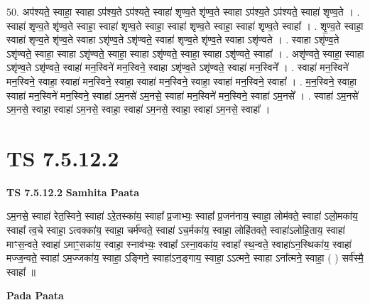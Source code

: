 \documentclass[17pt]{extarticle}
\begin{document}
50. अप॑श्यते॒ स्वाहा॒ स्वाहा ऽप॑श्य॒ते ऽप॑श्यते॒ स्वाहा॑ शृण्व॒ते शृ॑ण्व॒ते स्वाहा ऽप॑श्य॒ते ऽप॑श्यते॒ स्वाहा॑ शृण्व॒ते । . स्वाहा॑ शृण्व॒ते शृ॑ण्व॒ते स्वाहा॒ स्वाहा॑ शृण्व॒ते स्वाहा॒ स्वाहा॑ शृण्व॒ते स्वाहा॒ स्वाहा॑ शृण्व॒ते स्वाहा᳚ । . शृ॒ण्व॒ते स्वाहा॒ स्वाहा॑ शृण्व॒ते शृ॑ण्व॒ते स्वाहा ऽशृ॑ण्व॒ते ऽशृ॑ण्वते॒ स्वाहा॑ शृण्व॒ते शृ॑ण्व॒ते स्वाहा ऽशृ॑ण्वते । . स्वाहा ऽशृ॑ण्व॒ते ऽशृ॑ण्वते॒ स्वाहा॒ स्वाहा ऽशृ॑ण्वते॒ स्वाहा॒ स्वाहा ऽशृ॑ण्वते॒ स्वाहा॒ स्वाहा ऽशृ॑ण्वते॒ स्वाहा᳚ । . अशृ॑ण्वते॒ स्वाहा॒ स्वाहा ऽशृ॑ण्व॒ते ऽशृ॑ण्वते॒ स्वाहा॑ मन॒स्विने॑ मन॒स्विने॒ स्वाहा ऽशृ॑ण्व॒ते ऽशृ॑ण्वते॒ स्वाहा॑ मन॒स्विने᳚ । . स्वाहा॑ मन॒स्विने॑ मन॒स्विने॒ स्वाहा॒ स्वाहा॑ मन॒स्विने॒ स्वाहा॒ स्वाहा॑ मन॒स्विने॒ स्वाहा॒ स्वाहा॑ मन॒स्विने॒ स्वाहा᳚ । . म॒न॒स्विने॒ स्वाहा॒ स्वाहा॑ मन॒स्विने॑ मन॒स्विने॒ स्वाहा॑ ऽम॒नसे॑ ऽम॒नसे॒ स्वाहा॑ मन॒स्विने॑ मन॒स्विने॒ स्वाहा॑ ऽम॒नसे᳚ । . स्वाहा॑ ऽम॒नसे॑ ऽम॒नसे॒ स्वाहा॒ स्वाहा॑ ऽम॒नसे॒ स्वाहा॒ स्वाहा॑ ऽम॒नसे॒ स्वाहा॒ स्वाहा॑ ऽम॒नसे॒ स्वाहा᳚ । \newline
\pagebreak
{}

\section{ TS 7.5.12.2 }

\textbf{TS 7.5.12.2 } \newline
\textbf{Samhita Paata} \newline

ऽम॒नसे॒ स्वाहा॑ रेत॒स्विने॒ स्वाहा॑ ऽरे॒तस्का॑य॒ स्वाहा᳚ प्र॒जाभ्यः॒ स्वाहा᳚ प्र॒जन॑नाय॒ स्वाहा॒ लोम॑वते॒ स्वाहा॑ ऽलो॒मका॑य॒ स्वाहा᳚ त्व॒चे स्वाहा॒ ऽत्वक्का॑य॒ स्वाहा॒ चर्म॑ण्वते॒ स्वाहा॑ ऽच॒र्मका॑य॒ स्वाहा॒ लोहि॑तवते॒ स्वाहा॑ऽलोहि॒ताय॒ स्वाहा॑ माꣳस॒न्वते॒ स्वाहा॑ ऽमाꣳ॒॒सका॑य॒ स्वाहा॒ स्नाव॑भ्यः॒ स्वाहा᳚ ऽस्ना॒वका॑य॒ स्वाहा᳚ स्थ॒न्वते॒ स्वाहा॑ऽन॒स्थिका॑य॒ स्वाहा॑ मज्ज॒न्वते॒ स्वाहा॑ ऽम॒ज्जका॑य॒ स्वाहा॒ ऽङ्गिने॒ स्वाहा॑ऽन॒ङ्गाय॒ स्वाहा॒ ऽऽत्मने॒ स्वाहा ऽना᳚त्मने॒ स्वाहा॒ ( ) सर्व॑स्मै॒ स्वाहा᳚ ॥ \newline

\textbf{Pada Paata} \newline
\end{document}

